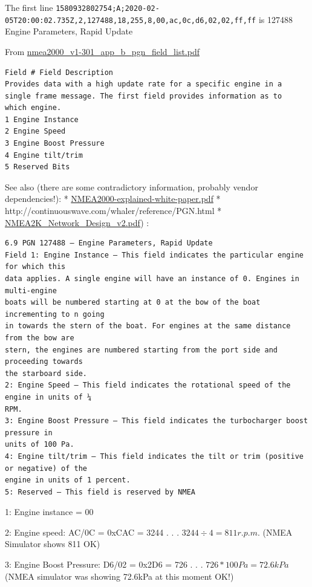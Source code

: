\documentclass[11pt]{article}
\begin{document}
    The first line
\texttt{1580932802754;A;2020-02-05T20:00:02.735Z,2,127488,18,255,8,00,ac,0c,d6,02,02,ff,ff}
is 127488 Engine Parameters, Rapid Update

    From
\href{http://www.nmea.org/Assets/july\%202010\%20nmea2000_v1-301_app_b_pgn_field_list.pdf}{nmea2000\_v1-301\_app\_b\_pgn\_field\_list.pdf}

\begin{verbatim}
Field # Field Description
Provides data with a high update rate for a specific engine in a single frame message. The first field provides information as to
which engine.
1 Engine Instance
2 Engine Speed
3 Engine Boost Pressure
4 Engine tilt/trim
5 Reserved Bits
\end{verbatim}

See also (there are some contradictory information, probably vendor
dependencies!): *
\href{https://www.nmea.org/Assets/20090423\%20rtcm\%20white\%20paper\%20nmea\%202000.pdf}{NMEA2000-explained-white-paper.pdf}
* http://continuouswave.com/whaler/reference/PGN.html *
\href{http://data.over-blog-kiwi.com/0/54/01/67/20151122/ob_f92436_nmea2k-network-design-v2.pdf}{NMEA2K\_Network\_Design\_v2.pdf})
:

\begin{verbatim}
6.9 PGN 127488 – Engine Parameters, Rapid Update
Field 1: Engine Instance – This field indicates the particular engine for which this
data applies. A single engine will have an instance of 0. Engines in multi-engine
boats will be numbered starting at 0 at the bow of the boat incrementing to n going
in towards the stern of the boat. For engines at the same distance from the bow are
stern, the engines are numbered starting from the port side and proceeding towards
the starboard side.
2: Engine Speed – This field indicates the rotational speed of the engine in units of ¼
RPM.
3: Engine Boost Pressure – This field indicates the turbocharger boost pressure in
units of 100 Pa.
4: Engine tilt/trim – This field indicates the tilt or trim (positive or negative) of the
engine in units of 1 percent.
5: Reserved – This field is reserved by NMEA 
\end{verbatim}

    1: Engine instance = 00

    2: Engine speed: AC/0C = 0xCAC = 3244 . . . \(3244 \div 4 = 811 r.p.m.\)
(NMEA Simulator shows 811 OK)

    3: Engine Boost Pressure: D6/02 = 0x2D6 = 726 . . .
\(726*100Pa=72.6kPa\) (NMEA simulator was showing 72.6kPa at this moment
OK!)
\end{document}
